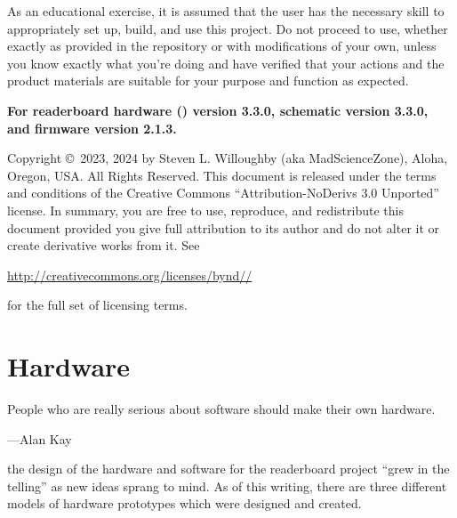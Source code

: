 As an educational exercise, it is assumed that the user has the necessary skill to appropriately set up, build,
and use this project. Do not proceed to use, whether exactly as provided in the repository or with modifications
of your own, unless you know exactly what you're doing and have verified that your actions and the product
materials are suitable for your purpose and function as expected.

\strut\vfill

\begin{center}\bfseries
	For readerboard hardware () version 3.3.0, schematic version 3.3.0, and firmware version 2.1.3.
\end{center}

\strut\vfill

\noindent Copyright \copyright\ 2023, 2024 by Steven L. Willoughby
(aka MadScienceZone), Aloha, Oregon, USA. All Rights Reserved.
This document is released under the terms and conditions of the
Creative Commons ``Attribution-NoDerivs 3.0 Unported'' license.
In summary, you are free to use, reproduce, and redistribute this 
document provided you give full attribution to its author and do not
alter it or create derivative works from it.  See
\begin{center}
\href{http://creativecommons.org/licenses/by-nd-3.0}{http://creativecommons.org/licenses/by\-nd\-//} 
\end{center}
for the full set of licensing terms.

\begin{center}
\end{center}

\newpage
\tableofcontents
\newpage
\listoffigures
\listoftables
\mainmatter

%
\chapter{Hardware}
\epigraph{People who are really serious about software should make their own hardware.}{---Alan Kay}
 the design of the hardware and software for the read\-erboard
project ``grew in the telling'' as new ideas sprang to mind. As of this writing, there are three
different models of hardware prototypes which were designed and created.

